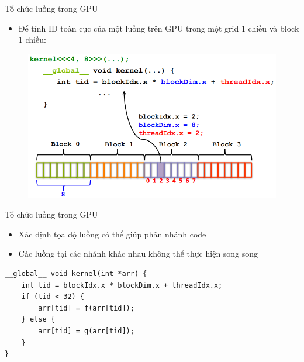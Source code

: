 \documentclass[10pt]{beamer}
\theoremstyle{remark}
\numberwithin{algocf}{section}
\numberwithin{equation}{section}
\numberwithin{dl}{section}
\numberwithin{figure}{section}
\begin{document}
\begin{frame}{Tổ chức luồng trong GPU}
    \begin{itemize}
        \item Để tính ID toàn cục của một luồng trên GPU trong một grid 1 chiều và block 1 chiều:
    \end{itemize}
    \begin{figure}[H]
        \centering
        \includegraphics[height=0.6\textheight]{figures/CUDA/Global_ThreadID_1d_Grid_1d_Block.png}
    \end{figure}
\end{frame}

\begin{frame}[fragile]{Tổ chức luồng trong GPU}
    \begin{itemize}
        \item Xác định tọa độ luồng có thể giúp phân nhánh code
        \item Các luồng tại các nhánh khác nhau không thể thực hiện song song
    \end{itemize}
    \begin{verbatim}
__global__ void kernel(int *arr) {
    int tid = blockIdx.x * blockDim.x + threadIdx.x;
    if (tid < 32) {
        arr[tid] = f(arr[tid]);
    } else {
        arr[tid] = g(arr[tid]);
    }
}
    \end{verbatim}
\end{frame}
\end{document}
